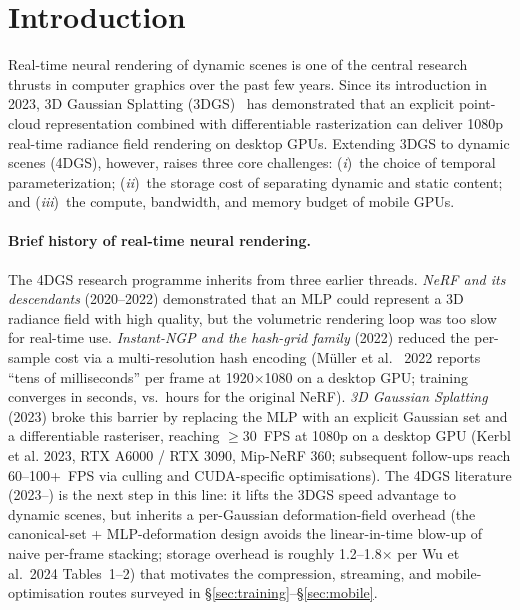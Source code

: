 
\section{Introduction}
\label{sec:intro}

Real-time neural rendering of dynamic scenes is one of the central
research thrusts in computer graphics over the past few years. Since
its introduction in 2023, 3D Gaussian Splatting (3DGS)~\cite{kerbl20233dgs}
has demonstrated that an explicit point-cloud representation combined
with differentiable rasterization can deliver 1080p real-time radiance
field rendering on desktop GPUs. Extending 3DGS to dynamic scenes
(4DGS), however, raises three core challenges: (\emph{i})~the choice of
temporal parameterization; (\emph{ii})~the storage cost of separating
dynamic and static content; and (\emph{iii})~the compute, bandwidth,
and memory budget of mobile GPUs.

\paragraph{Brief history of real-time neural rendering.}
The 4DGS research programme inherits from three earlier
threads. \emph{NeRF and its descendants} (2020--2022) demonstrated
that an MLP could represent a 3D radiance field with high
quality, but the volumetric rendering loop was too slow for
real-time use. \emph{Instant-NGP and the hash-grid family}
(2022) reduced the per-sample cost via a multi-resolution
hash encoding (M\"uller et al.~\cite{muller2022instantngp} 2022 reports ``tens of
milliseconds'' per frame at 1920$\times$1080 on a desktop GPU;
training converges in seconds, vs.\ hours for the original
NeRF). \emph{3D Gaussian
Splatting} (2023) broke this barrier by replacing the MLP
with an explicit Gaussian set and a differentiable rasteriser,
reaching $\geq$30~FPS at 1080p on a desktop GPU (Kerbl et al. 2023, RTX A6000 / RTX 3090, Mip-NeRF 360; subsequent follow-ups reach 60--100+~FPS via culling and CUDA-specific optimisations). The 4DGS
literature (2023--) is the next step in this line: it lifts
the 3DGS speed advantage to dynamic scenes, but inherits a
per-Gaussian deformation-field overhead (the canonical-set +
MLP-deformation design avoids the linear-in-time blow-up of
naive per-frame stacking; storage overhead is roughly
1.2--1.8$\times$ per Wu et al.\ 2024 Tables~1--2) that motivates
the compression, streaming, and mobile-optimisation routes
surveyed in \S\ref{sec:training}--\S\ref{sec:mobile}.

